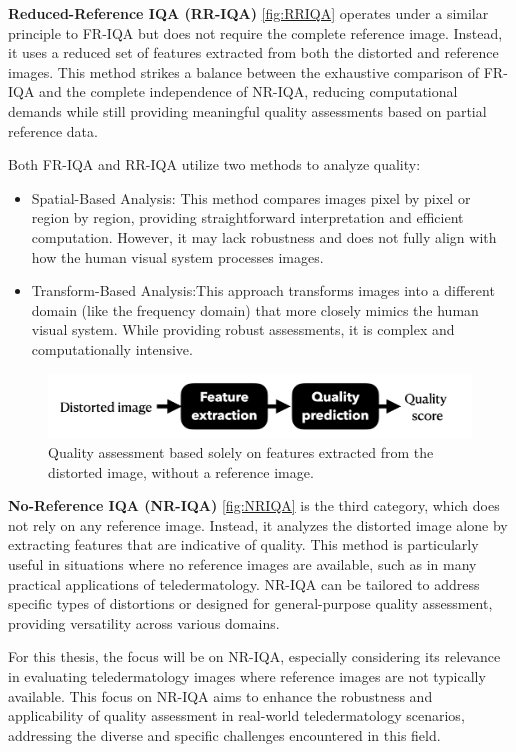 \textbf{Reduced-Reference IQA (RR-IQA)} \autoref{fig:RRIQA} operates under a similar principle to FR-IQA but does not require the complete reference image. Instead, it uses a reduced set of features extracted from both the distorted and reference images. This method strikes a balance between the exhaustive comparison of FR-IQA and the complete independence of NR-IQA, reducing computational demands while still providing meaningful quality assessments based on partial reference data. \par
\vspace{\baselineskip}
Both FR-IQA and RR-IQA utilize two methods to analyze quality:
\begin{itemize}
    \item Spatial-Based Analysis: This method compares images pixel by pixel or region by region, providing straightforward interpretation and efficient computation. However, it may lack robustness and does not fully align with how the human visual system processes images.
    \item Transform-Based Analysis:This approach transforms images into a different domain (like the frequency domain) that more closely mimics the human visual system. While providing robust assessments, it is complex and computationally intensive.
\end{itemize}
\vspace{\baselineskip}
\begin{figure}[ht]
    \centering
    \includegraphics[keepaspectratio,width=15cm]{img/NRIQA.png}
    \caption{Quality assessment based solely on features extracted from the distorted image, without a reference image.}
    \label{fig:NRIQA}
\end{figure}

\textbf{No-Reference IQA (NR-IQA)} \autoref{fig:NRIQA} is the third category, which does not rely on any reference image. Instead, it analyzes the distorted image alone by extracting features that are indicative of quality. This method is particularly useful in situations where no reference images are available, such as in many practical applications of teledermatology. NR-IQA can be tailored to address specific types of distortions or designed for general-purpose quality assessment, providing versatility across various domains. \par
\vspace{\baselineskip}
For this thesis, the focus will be on NR-IQA, especially considering its relevance in evaluating teledermatology images where reference images are not typically available. This focus on NR-IQA aims to enhance the robustness and applicability of quality assessment in real-world teledermatology scenarios, addressing the diverse and specific challenges encountered in this field.

